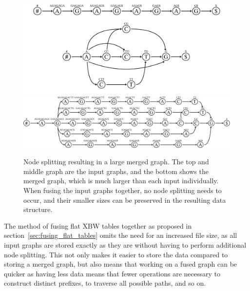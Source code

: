 \documentclass[a4paper,12pt,twoside,BCOR=10mm]{scrbook}
\begin{document}
\begin{figure}[!htb]
\centering
\includegraphics[width=\textwidth]{evo_fig_massive_split.pdf}
\includegraphics[width=\textwidth]{evo_fig_massive_split_3.pdf}
\caption[Node splitting resulting in large merged graph]{Node splitting resulting in a large merged graph. The top and middle graph are the input graphs, and the bottom shows the merged graph, which is much larger than each input individually. When fusing the input graphs together, no node splitting needs to occur, and their smaller sizes can be preserved in the resulting data structure.} \label{fig:evo_fig_massive_split}
\end{figure}

The method of fusing flat XBW tables together as proposed in section~\ref{sec:fusing_flat_tables} omits 
the need for an increased file size, 
as all input graphs are stored exactly as they are without having to perform additional node splitting. 
This not only makes it easier to store the data compared to storing a merged graph, 
but also means that working on 
a fused graph can be quicker as having less data means that fewer operations are necessary to construct 
distinct prefixes, to traverse all possible paths, and so on. 
\end{document}
